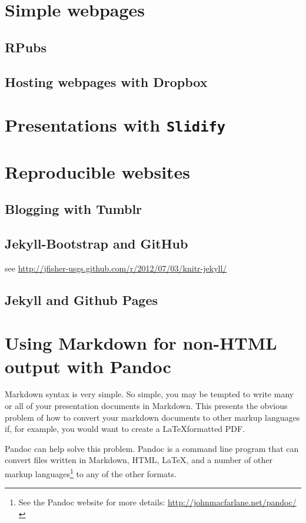 \documentclass[ChapterTOCs,krantz1]{krantz}\usepackage{graphicx, color}
\begin{document}
{{\section{Simple webpages}

\subsection{RPubs}

\subsection{Hosting webpages with Dropbox}

\section{Presentations with \texttt{Slidify}}

\section{Reproducible websites}

\subsection{Blogging with Tumblr}

\subsection{Jekyll-Bootstrap and GitHub}

see \url{http://jfisher-usgs.github.com/r/2012/07/03/knitr-jekyll/}

\subsection{Jekyll and Github Pages}

\section{Using Markdown for non-HTML output with Pandoc}

Markdown syntax is very simple. So simple, you may be tempted to write many or all of your presentation documents in Markdown. This presents the obvious problem of how to convert your markdown documents to other markup languages if, for example, you would want to create a \LaTeX formatted PDF. 

Pandoc can help solve this problem. Pandoc is a command line program that can convert files written in Markdown, HTML, \LaTeX, and a number of other markup languages\footnote{See the Pandoc website for more details: {\url{http://johnmacfarlane.net/pandoc/}}} to any of the other formats. 

}}
\end{document}
